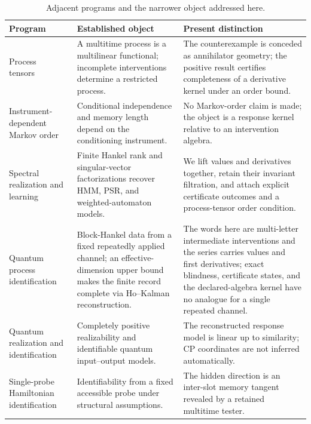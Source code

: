 \documentclass[aps,prl,onecolumn,superscriptaddress,nofootinbib]{revtex4-2}
\begin{document}
\begin{table}[t]
\caption{Adjacent programs and the narrower object addressed here.}
\label{tab:comparison}
\begin{tabular}{@{}lll@{}}
\toprule
\parbox[t]{0.20\linewidth}{Program} &
\parbox[t]{0.30\linewidth}{Established object} &
\parbox[t]{0.40\linewidth}{Present distinction}\\
\midrule
\parbox[t]{0.20\linewidth}{Process tensors~\cite{Pollock2018ProcessTensor,White2020ProcessControl,White2022ProcessTomography,Giarmatzi2025Multitime}} &
\parbox[t]{0.30\linewidth}{A multitime process is a multilinear functional; incomplete interventions determine a restricted process.} &
\parbox[t]{0.40\linewidth}{The counterexample is conceded as annihilator geometry; the positive result certifies completeness of a derivative kernel under an order bound.}\\[3pt]
\parbox[t]{0.20\linewidth}{Instrument-dependent Markov order~\cite{Taranto2019MarkovOrder}} &
\parbox[t]{0.30\linewidth}{Conditional independence and memory length depend on the conditioning instrument.} &
\parbox[t]{0.40\linewidth}{No Markov-order claim is made; the object is a response kernel relative to an intervention algebra.}\\[3pt]
\parbox[t]{0.20\linewidth}{Spectral realization and learning~\cite{Hsu2012HMM,Boots2011PSR,BalleMohri2012WFA,Balle2014WFA,BalleMohri2018WFA}} &
\parbox[t]{0.30\linewidth}{Finite Hankel rank and singular-vector factorizations recover HMM, PSR, and weighted-automaton models.} &
\parbox[t]{0.40\linewidth}{We lift values and derivatives together, retain their invariant filtration, and attach explicit certificate outcomes and a process-tensor order condition.}\\[3pt]
\parbox[t]{0.20\linewidth}{Quantum process identification~\cite{BenninkLougovski2019QPI}} &
\parbox[t]{0.30\linewidth}{Block-Hankel data from a fixed repeatedly applied channel; an effective-dimension upper bound makes the finite record complete via Ho--Kalman reconstruction.} &
\parbox[t]{0.40\linewidth}{The words here are multi-letter intermediate interventions and the series carries values and first derivatives; exact blindness, certificate states, and the declared-algebra kernel have no analogue for a single repeated channel.}\\[3pt]
\parbox[t]{0.20\linewidth}{Quantum realization and identification~\cite{MonrasWinter2016,GutaYamamoto2016}} &
\parbox[t]{0.30\linewidth}{Completely positive realizability and identifiable quantum input--output models.} &
\parbox[t]{0.40\linewidth}{The reconstructed response model is linear up to similarity; CP coordinates are not inferred automatically.}\\[3pt]
\parbox[t]{0.20\linewidth}{Single-probe Hamiltonian identification~\cite{SoneCappellaro2017}} &
\parbox[t]{0.30\linewidth}{Identifiability from a fixed accessible probe under structural assumptions.} &
\parbox[t]{0.40\linewidth}{The hidden direction is an inter-slot memory tangent revealed by a retained multitime tester.}\\
\bottomrule
\end{tabular}
\end{table}
\end{document}
